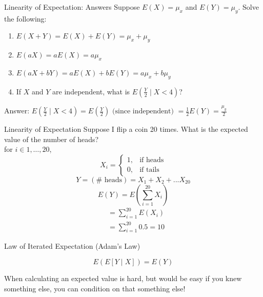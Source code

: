 \documentclass{beamer}
\begin{document}
\begin{frame}{Linearity of Expectation: Answers}
Suppose $E(X)=\mu_x$ and $E(Y)=\mu_y$. Solve the following:
\begin{enumerate}
\item $E(X+Y) = E(X) + E(Y) = \mu_x+\mu_y$
\item $E(aX) = aE(X) = a\mu_x$
\item $E(aX+bY) = aE(X)+bE(Y) = a\mu_x + b\mu_y$
\item If $X$ and $Y$ are independent, what is $E\left(\frac{Y}{2}\mid X<4\right)$?
\end{enumerate}
Answer: $E(\frac{Y}{2}\mid X<4)=E\left(\frac{Y}{2}\right)\text{ (since independent) }=\frac{1}{2}E(Y)=\frac{\mu_y}{2}$
\end{frame}

\begin{frame}{Linearity of Expectation}
Suppose I flip a coin 20 times. What is the expected value of the number of heads? \\
\pause
for $i\in 1,\dots,20$,
$$X_i=\begin{cases}1,& \text{if heads} \\
0,& \text{if tails} \end{cases}$$
$$Y = (\#\text{ heads}) = X_1+X_2+...X_{20}$$
\pause
$$E(Y) = E\left (\sum_{i=1}^{20} X_i\right )$$
\pause
\begin{align*}
&=\sum_{i=1}^{20} E(X_i) \\
&=\sum_{i=1}^{20} 0.5 = 10
\end{align*}
\end{frame}

\begin{frame}{Law of Iterated Expectation (Adam's Law)}
\begin{theorem}
$$E(E[Y\mid X])=E(Y)$$
\end{theorem}
When calculating an expected value is hard, but would be easy if you knew something else, \alert{you can condition on that something else!}
\end{frame}
\end{document}
